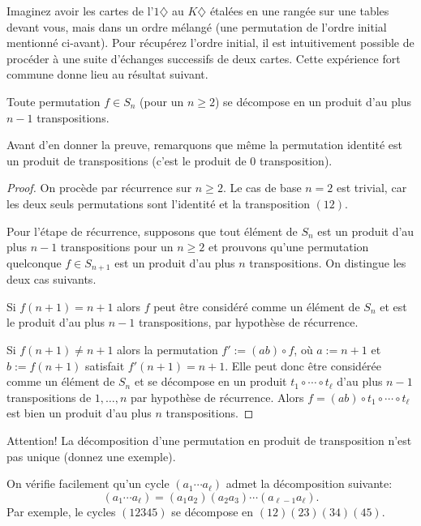 \documentclass[french,course,oneside,theoremnosection]{lecture}
\begin{document}
Imaginez avoir les cartes de l'$1\diamondsuit$ au $K\diamondsuit$ étalées en une rangée sur une tables devant vous, mais dans un ordre mélangé (une permutation de l'ordre initial mentionné ci-avant). Pour récupérez l'ordre initial, il est intuitivement possible de procéder à une suite d'échanges successifs de deux cartes. Cette expérience fort commune donne lieu au résultat suivant.

\begin{proposition}
Toute permutation $f\in S_n$ (pour un $n\geq 2$) se décompose en un produit d'au plus $n-1$ transpositions. 
\end{proposition}
Avant d'en donner la preuve, remarquons que même la permutation identité est un produit de transpositions (c'est le produit de 0 transposition).

\begin{proof}
On procède par récurrence sur $n\geq 2$. Le cas de base $n=2$ est trivial, car les deux seuls permutations sont l'identité et la transposition $(12)$.

Pour l'étape de récurrence, supposons que tout élément de $S_n$ est un produit d'au plus $n-1$ transpositions pour un $n\geq 2$ et prouvons qu'une permutation quelconque $f\in S_{n+1}$ est un produit d'au plus $n$ transpositions. On distingue les deux cas suivants.

Si $f(n+1)=n+1$ alors $f$ peut être considéré comme un élément de $S_{n}$ et est le produit d'au plus $n-1$ transpositions, par hypothèse de récurrence.

Si $f(n+1)\neq n+1$ alors la permutation $f':=(ab)\circ f$, où $a:=n+1$ et $b:=f(n+1)$ satisfait $f'(n+1)=n+1$. Elle peut donc être considérée comme un élément de $S_n$ et se décompose en un produit $t_1\circ \cdots \circ t_\ell$ d'au plus $n-1$ transpositions de ${1, \ldots, n}$ par hypothèse de récurrence. Alors $f=(ab)\circ t_1\circ \cdots \circ t_\ell$ est bien un produit d'au plus $n$ transpositions.
\end{proof}
\begin{remark}
Attention! La décomposition d'une permutation en produit de transposition n'est pas unique (donnez une exemple).
\end{remark}
\begin{example}
On vérifie facilement qu'un cycle $(a_1\cdots a_\ell)$ admet la décomposition suivante:
\[
(a_1\cdots a_\ell) = (a_1a_2)(a_2a_3)\cdots(a_{\ell-1}a_\ell).
\]
Par exemple, le cycles $(12345)$ se décompose en $(12)(23)(34)(45)$.
\end{example}
\end{document}
